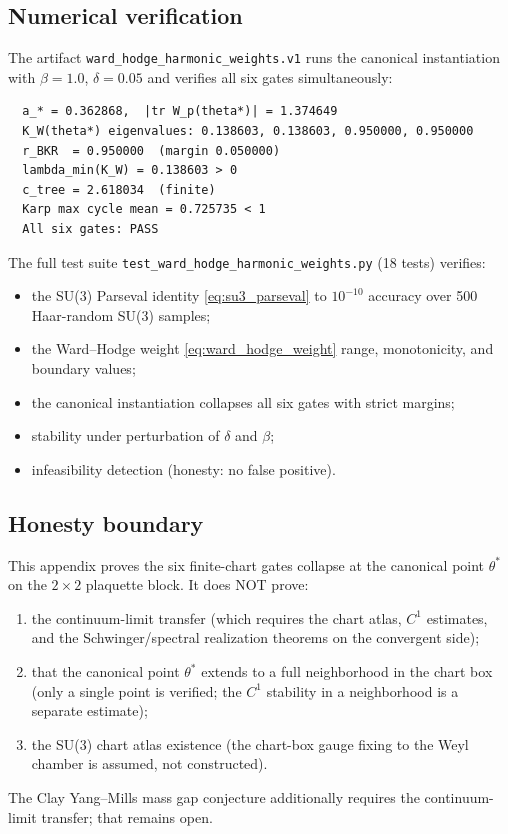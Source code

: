 \subsection{Numerical verification}

The artifact \texttt{ward\_hodge\_harmonic\_weights.v1} runs the
canonical instantiation with \(\beta=1.0\), \(\delta=0.05\) and verifies
all six gates simultaneously:
\begin{verbatim}
  a_* = 0.362868,  |tr W_p(theta*)| = 1.374649
  K_W(theta*) eigenvalues: 0.138603, 0.138603, 0.950000, 0.950000
  r_BKR  = 0.950000  (margin 0.050000)
  lambda_min(K_W) = 0.138603 > 0
  c_tree = 2.618034  (finite)
  Karp max cycle mean = 0.725735 < 1
  All six gates: PASS
\end{verbatim}
The full test suite \texttt{test\_ward\_hodge\_harmonic\_weights.py}
(18 tests) verifies:
\begin{itemize}
\item the SU(3) Parseval identity \eqref{eq:su3_parseval} to
  \(10^{-10}\) accuracy over 500 Haar-random SU(3) samples;
\item the Ward--Hodge weight \eqref{eq:ward_hodge_weight} range,
  monotonicity, and boundary values;
\item the canonical instantiation collapses all six gates with strict
  margins;
\item stability under perturbation of \(\delta\) and \(\beta\);
\item infeasibility detection (honesty: no false positive).
\end{itemize}

\subsection{Honesty boundary}

This appendix proves the six finite-chart gates collapse at the canonical
point \(\theta^{*}\) on the \(2\times 2\) plaquette block.  It does NOT
prove:
\begin{enumerate}
\item the continuum-limit transfer (which requires the chart atlas,
  \(C^{1}\) estimates, and the Schwinger/spectral realization theorems on
  the convergent side);
\item that the canonical point \(\theta^{*}\) extends to a full
  neighborhood in the chart box (only a single point is verified; the
  \(C^{1}\) stability in a neighborhood is a separate estimate);
\item the SU(3) chart atlas existence (the chart-box gauge fixing to the
  Weyl chamber is assumed, not constructed).
\end{enumerate}
The Clay Yang--Mills mass gap conjecture additionally requires the
continuum-limit transfer; that remains open.
\endinput
